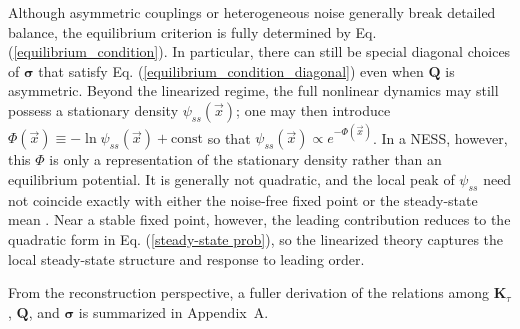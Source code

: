 Although asymmetric couplings or heterogeneous noise generally break detailed balance, the equilibrium criterion is fully determined by Eq. (\ref{equilibrium_condition}). In particular, there can still be special diagonal choices of $\boldsymbol{\sigma}$ that satisfy Eq. (\ref{equilibrium_condition_diagonal}) even when $\mathbf{Q}$ is asymmetric. Beyond the linearized regime, the full nonlinear dynamics may still possess a stationary density $\psi_{ss}(\vec{x})$; one may then introduce $\Phi(\vec{x})\equiv -\ln \psi_{ss}(\vec{x})+\text{const}$ so that $\psi_{ss}(\vec{x}) \propto e^{-\Phi(\vec{x})}$. In a NESS, however, this $\Phi$ is only a representation of the stationary density rather than an equilibrium potential. It is generally not quadratic, and the local peak of $\psi_{ss}$ need not coincide exactly with either the noise-free fixed point or the steady-state mean \cite{PhysRevE.84.061106}. Near a stable fixed point, however, the leading contribution reduces to the quadratic form in Eq. (\ref{steady-state prob}), so the linearized theory captures the local steady-state structure and response to leading order.\par
From the reconstruction perspective, a fuller derivation of the relations among $\mathbf{K}_\tau$, $\mathbf{Q}$, and $\boldsymbol{\sigma}$ is summarized in Appendix~A.
